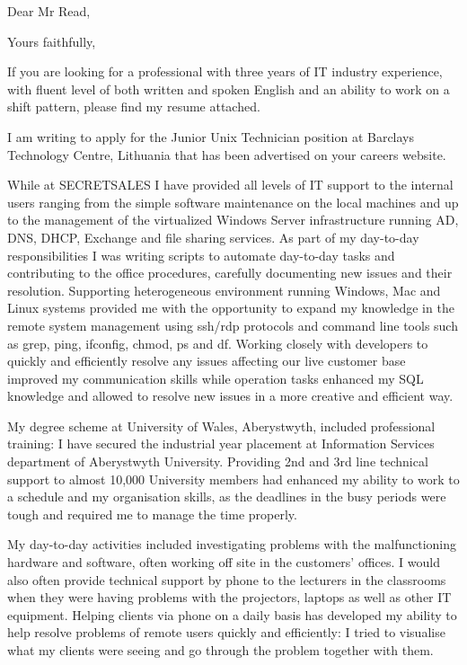 \documentclass[11pt,a4paper,sans]{moderncv}        %
\begin{document}
\date{\today}
\opening{Dear Mr Read,}
\closing{Yours faithfully,}
\makelettertitle

If you are looking for a professional with three years of IT industry experience, with fluent level of both written and spoken English and an ability to work on a shift pattern, please find my resume attached.

I am writing to apply for the Junior Unix Technician position at Barclays Technology Centre, Lithuania that has been advertised on your careers website.

While at SECRETSALES I have provided all levels of IT support to the internal users ranging from the simple software maintenance on the local machines and up to the management of the virtualized Windows Server infrastructure running AD, DNS, DHCP, Exchange and file sharing services.
As part of my day-to-day responsibilities I was writing scripts to automate day-to-day tasks and contributing to the office procedures, carefully documenting new issues and their resolution. Supporting heterogeneous environment running Windows, Mac and Linux systems provided me with the opportunity to expand my knowledge in the remote system management using ssh/rdp protocols and command line tools such as grep, ping, ifconfig, chmod, ps and df. 
Working closely with developers to quickly and efficiently resolve any issues affecting our live customer base improved my communication skills while operation tasks enhanced my SQL knowledge and allowed to resolve new issues in a more creative and efficient way.

My degree scheme at University of Wales, Aberystwyth, included professional training: I have secured the industrial year placement at Information Services department of Aberystwyth University. Providing 2nd and 3rd line technical support to almost 10,000 University members had enhanced my ability to work to a schedule and my organisation skills, as the deadlines in the busy periods were tough and required me to manage the time properly. 

My day-to-day activities included investigating problems with the malfunctioning hardware and software, often working off site in the customers’ offices. I would also often provide technical support by phone to the lecturers in the classrooms when they were having problems with the projectors, laptops as well as other IT equipment.  Helping clients via phone on a daily basis has developed my ability to help resolve problems of remote users quickly and efficiently: I tried to visualise what my clients were seeing and go through the problem together with them.
\end{document}
